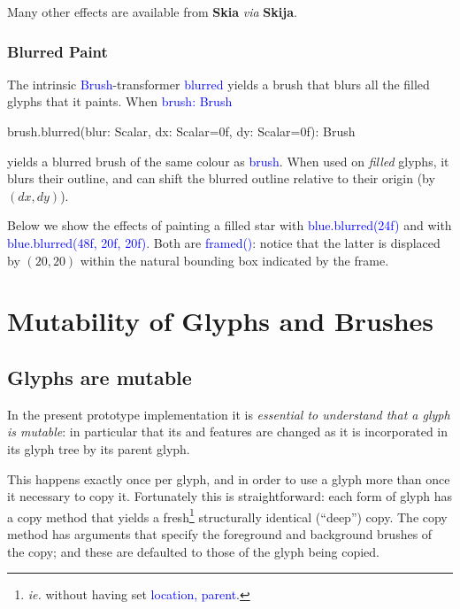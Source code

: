\documentclass[12pt,a4paper]{article}
\def\Scala#1{\textcolor{blue}{\textsf{#1}}}
\def\S#1{\section{#1}}
\def\SS#1{\subsection{#1}}
\def\SSS#1{\subsubsection*{#1}}
\begin{document}
Many other effects are available from \textbf{Skia} \textit{via} \textbf{Skija}. 

\SSS{Blurred Paint}
The intrinsic \Scala{Brush}-transformer \Scala{blurred} yields a
brush that blurs all the filled glyphs that it paints. When \Scala{brush: Brush}
\begin{scala}
   brush.blurred(blur: Scalar, dx: Scalar=0f, dy: Scalar=0f): Brush
\end{scala}

yields a blurred brush of the same colour as \Scala{brush}. When
used on \textit{filled} glyphs, it blurs their outline, and
can shift the blurred outline relative to their origin (by $(dx, dy)$).

Below we show the effects of painting a filled star with
\Scala{blue.blurred(24f)} and with \Scala{blue.blurred(48f, 20f, 20f)}.
Both are \Scala{framed()}: notice that the latter is displaced by $(20, 20)$ within the
natural bounding box indicated by the frame.

\begin{center}
\quad\quad
{}
\end{center}

\clearpage

\appendix
\S{Mutability of Glyphs and Brushes}
\SS{Glyphs are mutable}\label{glyphsaremutable}
In the present prototype implementation it is \textit{essential to understand that a glyph 
is mutable}: in particular that its  and  features are changed as it is
incorporated in its glyph tree by its parent glyph.

This happens exactly once per glyph, and in order to use a glyph
more than once it necessary to copy it. Fortunately this is
straightforward: each form of glyph has a copy method that yields
a fresh\footnote{\textit{ie.} without having set
\textcolor{blue}{\textsf{location, parent}}.} structurally identical
(``deep'') copy. The copy method has  arguments that
specify the foreground and background brushes of the copy; and these
are defaulted to those of the glyph being copied.
\end{document}
